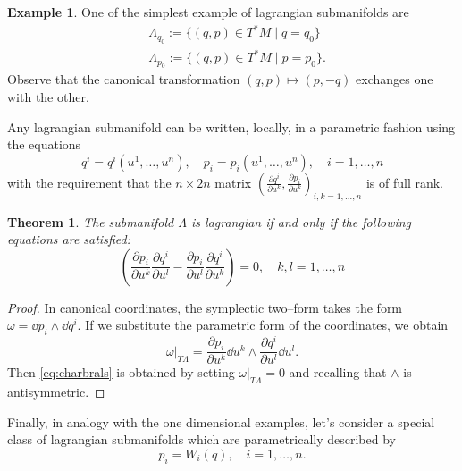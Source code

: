 \documentclass[english,fontsize=11pt,paper=b5]{scrbook}
\newtheorem{theorem}{Theorem}[chapter]
\theoremstyle{definition}
\newtheorem{example}{Example}[chapter]
\begin{document}
    \begin{example}
      One of the simplest example of lagrangian submanifolds are
      \begin{align}
     & \Lambda_{q_0} := \big\{(q,p)\in T^*M \mid q=q_0\big\}  \\
     & \Lambda_{p_0} := \big\{(q,p)\in T^*M \mid p=p_0\big\}.
      \end{align}
      Observe that the canonical transformation $(q,p) \mapsto (p,-q)$ exchanges one with the other.
    \end{example}

    Any lagrangian submanifold can be written, locally, in a parametric fashion using the equations
    \begin{equation}
      q^i = q^i(u^1, \ldots, u^n), \quad p_i = p_i(u^1, \ldots, u^n), \quad i=1,\ldots,n
    \end{equation}
    with the requirement that the $n\times2n$ matrix $\left(\frac{\partial q^i}{\partial u^k}, \frac{\partial p_i}{\partial u^k}\right)_{i,k=1,\ldots,n}$ is of full rank.

    \begin{theorem}\label{thm:charbrals}
      The submanifold $\Lambda$ is lagrangian if and only if the following equations are satisfied:
      \begin{equation}\label{eq:charbrals}
        \left(\frac{\partial p_i}{\partial u^k}\frac{\partial q^i}{\partial u^l} - \frac{\partial p_i}{\partial u^l}\frac{\partial q^i}{\partial u^k} \right) = 0,
        \quad k,l=1,\ldots,n
      \end{equation}
    \end{theorem}
    \begin{proof}
      In canonical coordinates, the symplectic two--form takes the form $\omega = \dd p_i \wedge \dd q^i$. If we substitute the parametric form of the coordinates, we obtain
      \begin{equation}
        \omega |_{T\Lambda} = \frac{\partial p_i}{\partial u^k}\dd u^k \wedge \frac{\partial q^i}{\partial u^l}\dd u^l.
      \end{equation}
      Then \eqref{eq:charbrals} is obtained by setting $\omega |_{T\Lambda} = 0$ and recalling that $\wedge$ is antisymmetric.
    \end{proof}

    Finally, in analogy with the one dimensional examples, let's consider a special class of lagrangian submanifolds which are parametrically described by
    \begin{equation}\label{eq:lagsbmPofQ}
      p_i = W_i(q), \quad i=1,\ldots,n.
    \end{equation}
\end{document}
